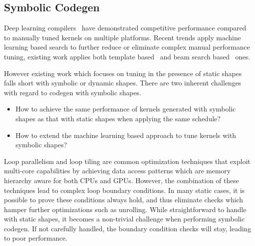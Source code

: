 \subsection{Symbolic Codegen}
\label{sec:compliation:codegen}
Deep learning compilers~\citep{tvm_osdi18, halide} have demonstrated competitive performance compared to manually tuned kernels on multiple platforms. Recent trends apply machine learning based search to further reduce or eliminate complex manual performance tuning, existing work applies both template based~\citep{chen2018learning, zheng2020flextensor} and beam search based~\citep{adams2019learning} ones.

However existing work which focuses on tuning in the presence of static shapes falls short with symbolic or dynamic shapes. There are two inherent challenges with regard to codegen with symbolic shapes.
\begin{itemize}
    \itemsep 0em
    \item How to achieve the same performance of kernels generated with symbolic shapes as that with static shapes when applying the same schedule?
    \item How to extend the machine learning based approach to tune kernels with symbolic shapes?
\end{itemize}

Loop parallelism and loop tiling are common optimization techniques that exploit multi-core capabilities by achieving data access patterns which are memory hierarchy aware for both CPUs and GPUs. However, the combination of these techniques lead to complex loop boundary conditions. In many static cases, it is possible to prove these conditions always hold, and thus eliminate checks which hamper further optimizations such as unrolling.
While straightforward to handle with static shapes, it becomes a non-trivial challenge when performing symbolic codegen. If not carefully handled, the boundary condition checks will stay, leading to poor performance.

